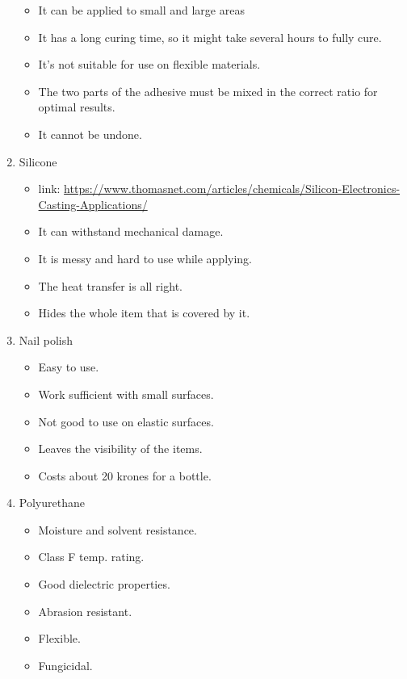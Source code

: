 \documentclass{article}[10pt]
\begin{document}
\begin{enumerate}
\begin{itemize}
              \item It can be applied to small and large areas
              \item It has a long curing time, so it might take several hours to fully cure.
              \item It's not suitable for use on flexible materials.
              \item The two parts of the adhesive must be mixed in the correct ratio for optimal results.
              \item It cannot be undone.
          \end{itemize}
    \item Silicone
          \begin{itemize}
              \item link: \url{https://www.thomasnet.com/articles/chemicals/Silicon-Electronics-Casting-Applications/}
              \item It can withstand mechanical damage.
              \item It is messy and hard to use while applying.
              \item The heat transfer is all right.
              \item Hides the whole item that is covered by it.
          \end{itemize}
    \item Nail polish
          \begin{itemize}
              \item Easy to use.
              \item Work sufficient with small surfaces.
              \item Not good to use on elastic surfaces.
              \item Leaves the visibility of the items.
              \item Costs about 20 krones for a bottle.
          \end{itemize}
    \item Polyurethane
          \begin{itemize}
              \item Moisture and solvent resistance.
              \item Class F temp. rating.
              \item Good dielectric properties.
              \item Abrasion resistant.
              \item Flexible.
              \item Fungicidal.

\end{itemize}
\end{enumerate}
\end{document}
